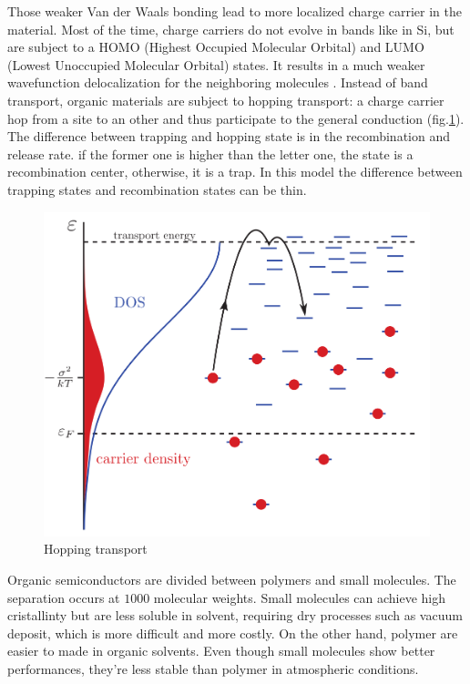 Those weaker Van der Waals bonding lead to more localized charge carrier in the material. Most of the time, charge carriers do not evolve in bands like in Si, but are subject to a HOMO (Highest Occupied Molecular Orbital) and LUMO (Lowest Unoccupied Molecular Orbital) states. It results in a much weaker wavefunction delocalization for the neighboring molecules \cite{intro_orga}. Instead of band transport, organic materials are subject to hopping transport: a charge carrier hop from a site to an other and thus participate to the general conduction (fig.\ref{fig:4}). The difference between trapping and hopping state is in the recombination and release rate. if the former one is higher than the letter one, the state is a recombination center, otherwise, it is a trap. In this model the difference between trapping states and recombination states can be thin.

\begin{figure}
    \centering
    \includegraphics*[width=0.4\paperwidth]{figures/hopping_theory.png}
    \caption{Hopping transport \label{fig:4}}
\end{figure}

Organic semiconductors are divided between polymers and small molecules. The separation occurs at $1000$ molecular weights. Small molecules can achieve high cristallinty but are less soluble in solvent, requiring dry processes such as vacuum deposit, which is more difficult and more costly. On the other hand, polymer are easier to made in organic solvents. Even though small molecules show better performances, they're less stable than polymer in atmospheric conditions.

